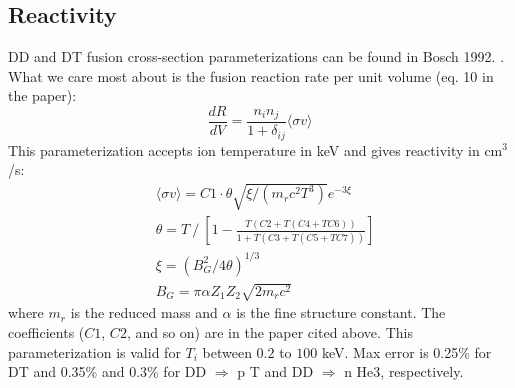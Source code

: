 \subsection{Reactivity}
DD and DT fusion cross-section parameterizations can be found in Bosch 1992. \cite{Bosch_1992}. What we care most about is the fusion reaction rate per unit volume (eq. 10 in the paper):
\begin{equation}
    \frac{dR}{dV} = \frac{n_i n_j}{1+\delta_{ij}} \langle \sigma v \rangle
\end{equation}
This parameterization accepts ion temperature in keV and gives reactivity in cm$^3$/s:
\begin{align}
    & \langle \sigma v \rangle = C1 \cdot \theta \sqrt{\xi / (m_r c^2 T^3)} e^{-3 \xi} \\
    & \theta = T \mathbin{/} \left[ 1 - \frac{T(C2 + T(C4 + TC6))}{1 + T(C3 + T(C5 + TC7))} \right] \\
    & \xi = \left( B_G^2 / 4\theta \right)^{1/3} \\
    & B_G = \pi \alpha Z_1 Z_2 \sqrt{2 m_r c^2}
\end{align}
where $m_r$ is the reduced mass and $\alpha$ is the fine structure constant. The coefficients ($C1$, $C2$, and so on) are in the paper cited above. This parameterization is valid for $T_i$ between $0.2$ to $100$ keV.  Max error is 0.25\% for DT and 0.35\% and 0.3\% for DD $\Rightarrow$ p T and DD $\Rightarrow$ n He3, respectively.  

